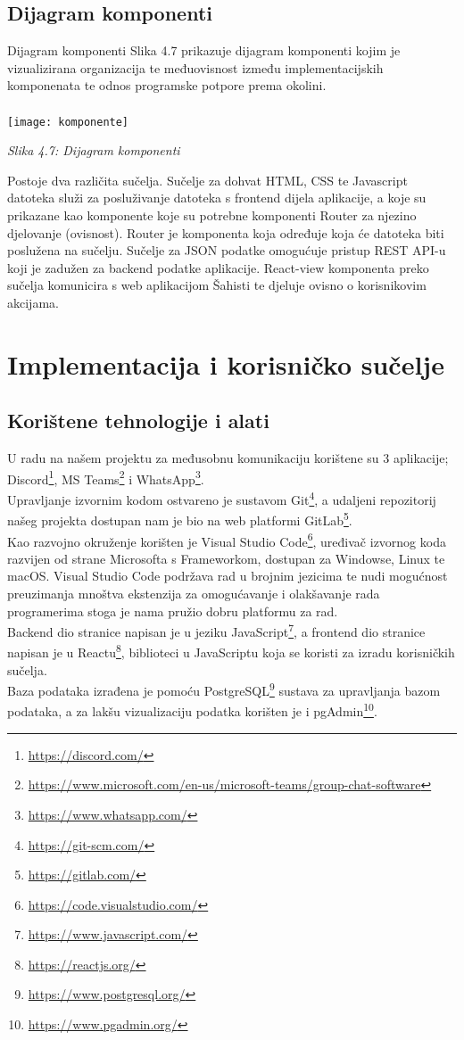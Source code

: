 \documentclass{article}
\begin{document}
	\subsection{Dijagram komponenti}
	Dijagram komponenti
	Slika 4.7 prikazuje dijagram komponenti kojim je vizualizirana organizacija te međuovisnost između implementacijskih komponenata te odnos programske potpore prema okolini.\\
	\\
	\texttt{[image: komponente]}
	\begin{center}
		\textit{Slika 4.7: Dijagram komponenti}
	\end{center}
	Postoje dva različita sučelja. Sučelje za dohvat HTML, CSS te Javascript datoteka služi za posluživanje datoteka s frontend dijela aplikacije, a koje su prikazane kao komponente koje su potrebne komponenti Router za njezino djelovanje (ovisnost). Router je komponenta koja određuje koja će datoteka biti poslužena na sučelju. Sučelje za JSON podatke omogućuje pristup REST API-u koji je zadužen za backend podatke aplikacije. React-view komponenta preko sučelja komunicira s web aplikacijom Šahisti te djeluje ovisno o korisnikovim akcijama.
	\eject
	
	\section{Implementacija i korisničko sučelje}
	\subsection{Korištene tehnologije i alati}
	U radu na našem projektu za međusobnu komunikaciju korištene su 3 aplikacije; Discord\footnote{\url{https://discord.com/}}, MS Teams\footnote{\url{https://www.microsoft.com/en-us/microsoft-teams/group-chat-software}} i WhatsApp\footnote{\url{https://www.whatsapp.com/}}.\\
	Upravljanje izvornim kodom ostvareno je sustavom Git\footnote{\url{https://git-scm.com/}}, a udaljeni repozitorij našeg projekta dostupan nam je bio na web platformi GitLab\footnote{\url{https://gitlab.com/}}.\\
	Kao razvojno okruženje korišten je Visual Studio Code\footnote{\url{https://code.visualstudio.com/}}, uređivač izvornog koda razvijen od strane Microsofta s Frameworkom, dostupan za Windowse, Linux te macOS. Visual Studio Code podržava rad u brojnim jezicima te nudi mogućnost preuzimanja mnoštva ekstenzija za omogućavanje i olakšavanje rada programerima stoga je nama pružio dobru platformu za rad.\\
	Backend dio stranice napisan je u jeziku JavaScript\footnote{\url{https://www.javascript.com/}}, a frontend dio stranice napisan je u Reactu\footnote{\url{https://reactjs.org/}}, biblioteci u JavaScriptu koja se koristi za izradu korisničkih sučelja.\\
	Baza podataka izrađena je pomoću PostgreSQL\footnote{\url{https://www.postgresql.org/}} sustava za upravljanja bazom podataka, a za lakšu vizualizaciju podatka korišten je i pgAdmin\footnote{\url{https://www.pgadmin.org/}}.  
	\eject
\end{document}
